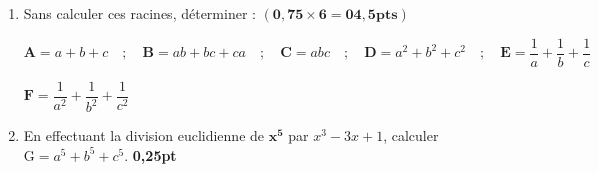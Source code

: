 \documentclass[12pt,a4paper]{article}
\begin{document}
\begin{enumerate}
    \item[1)] Sans calculer ces racines, déterminer : $\mathbf{(0,75 \times 6 = 04,5pts)}$
    
    \vspace{0.5em}
    $\mathbf{A} = a + b + c \quad ; \quad \mathbf{B} = ab + bc + ca \quad ; \quad \mathbf{C} = abc \quad ; \quad \mathbf{D} = a^2 + b^2 + c^2 \quad ; \quad \mathbf{E} = \dfrac{1}{a} + \dfrac{1}{b} + \dfrac{1}{c}$
    
    \vspace{0.5em}
    $\mathbf{F} = \dfrac{1}{a^2} + \dfrac{1}{b^2} + \dfrac{1}{c^2}$

    \item[\textbf{2)}] En effectuant la division euclidienne de $\mathbf{x^5}$ par $x^3 - 3x + 1$, calculer $\text{G} = a^5 + b^5 + c^5$. \hfill \textbf{0,25pt}
\end{enumerate}
\end{document}
